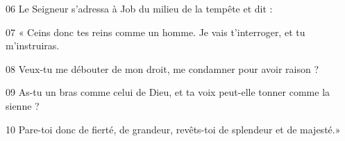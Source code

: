 06 Le Seigneur s’adressa à Job du milieu de la tempête et dit :

07 « Ceins donc tes reins comme un homme. Je vais t’interroger, et tu m’instruiras.

08 Veux-tu me débouter de mon droit, me condamner pour avoir raison ?

09 As-tu un bras comme celui de Dieu, et ta voix peut-elle tonner comme la sienne ?

10 Pare-toi donc de fierté, de grandeur, revêts-toi de splendeur et de majesté.»


